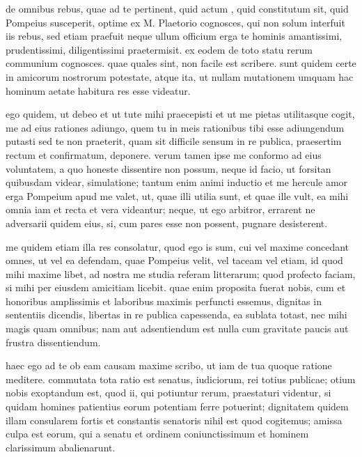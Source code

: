 


 de omnibus rebus, quae ad te pertinent, quid actum , quid constitutum sit, quid Pompeius susceperit, optime ex M. Plaetorio cognosces, qui non solum interfuit iis rebus, sed etiam praefuit neque ullum officium erga te hominis amantissimi, prudentissimi, diligentissimi praetermisit. ex eodem de toto statu rerum communium cognosces. quae quales sint, non facile est scribere. sunt quidem certe in amicorum nostrorum potestate, atque ita, ut nullam mutationem umquam hac hominum aetate habitura res esse videatur.

 ego quidem, ut debeo et ut tute mihi praecepisti et ut me pietas utilitasque cogit, me ad eius rationes adiungo, quem tu in meis rationibus tibi esse adiungendum putasti sed te non praeterit, quam sit difficile sensum in re publica, praesertim rectum et confirmatum, deponere. verum tamen ipse me conformo ad eius voluntatem, a quo honeste dissentire non possum, neque id facio, ut forsitan quibusdam videar, simulatione; tantum enim animi inductio et me hercule amor erga Pompeium apud me valet, ut, quae illi utilia sunt, et quae ille vult, ea mihi omnia iam et recta et vera videantur; neque, ut ego arbitror, errarent ne adversarii quidem eius, si, cum pares esse non possent, pugnare desisterent.

 me quidem etiam illa res consolatur, quod ego is sum, cui vel maxime concedant omnes, ut vel ea defendam, quae Pompeius velit, vel taceam vel etiam, id quod mihi maxime libet, ad nostra me studia referam litterarum; quod profecto faciam, si mihi per eiusdem amicitiam licebit. quae enim proposita fuerat nobis, cum et honoribus amplissimis et laboribus maximis perfuncti essemus, dignitas in sententiis dicendis, libertas in re publica capessenda, ea sublata totast, nec mihi magis quam omnibus; nam aut adsentiendum est nulla cum gravitate paucis aut frustra dissentiendum.

 haec ego ad te ob eam causam maxime scribo, ut iam de tua quoque ratione meditere. commutata tota ratio est senatus, iudiciorum, rei totius publicae; otium nobis exoptandum est, quod ii, qui potiuntur rerum, praestaturi videntur, si quidam homines patientius eorum potentiam ferre potuerint; dignitatem quidem illam consularem fortis et constantis senatoris nihil est quod cogitemus; amissa culpa est eorum, qui a senatu et ordinem coniunctissimum et hominem clarissimum abalienarunt.

